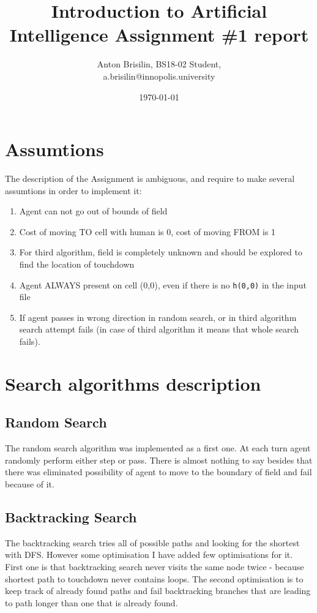 \documentclass[a4paper,12pt]{article}
\title{Introduction to Artificial Intelligence Assignment \#1 report}
\author{Anton Brisilin, BS18-02 Student, \\ a.brisilin@innopolis.university}
\date{\today}
\begin{document}
\maketitle
    \section{Assumtions}
    The description of the Assignment is ambiguous, and require to make several
    assumtions in order to implement it:
    \begin{enumerate}
        \item Agent can not go out of bounds of field
        \item Cost of moving TO cell with human is 0, cost of moving FROM is 1
        \item For third algorithm, field is completely unknown and should be 
        explored to find the location of touchdown
        \item Agent ALWAYS present on cell (0,0), even if there is no \texttt{h(0,0)}
        in the input file
        \item If agent passes in wrong direction in random search, or in third algorithm
        search attempt fails (in case of third algorithm it means that whole search
        fails).
    \end{enumerate} 
    \section{Search algorithms description}
    \subsection{Random Search}
    The random search algorithm was implemented as a first one. At each turn 
    agent randomly perform either step or pass. There is almost nothing to say
    besides that there was eliminated possibility of agent to move to the 
    boundary of field and fail because of it.
    \subsection{Backtracking Search}
    The backtracking search tries all of possible paths and looking for the 
    shortest with DFS. However some optimisation I have added few optimisations 
    for it. First one is that backtracking search never visits the same node 
    twice - because shortest path to touchdown never contains loops. The second 
    optimisation is to keep track of already found paths and fail backtracking
    branches that are leading to path longer than one that is already found.
\end{document}
